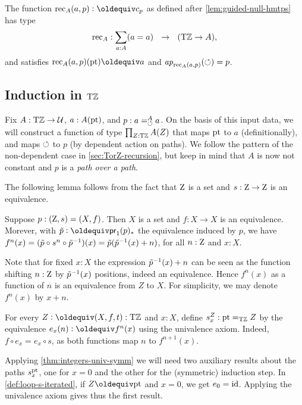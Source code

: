 \documentclass[a4paper,12pt]{amsart}
\begin{document}
\begin{definition}\label{def:TorZrecursor}
  The function ${\rec}_A(a,p) \defeq c_p$ as defined after 
  \cref{lem:guided-null-hmtps} has type
  \[
    {\mathop{\mathrm{rec}}}_A : \sum_{a:A}(a=a) ~~\to~~ ({\mathrm{T}\mathbb{Z}} \to A),
  \]
  and satisfies ${\rec}_A(a,p)(\pt) \jdeq a$ and 
  $\mathop{{\it ap}_{{\mathop{\mathrm{rec}}}_A(a,p)}}(\circlearrowleft) = p$.
\end{definition}

\subsection{Induction in ${\mathrm{T}\mathbb{Z}}$}\label{sec:TorZ-induction}

Fix $A:{\mathrm{T}\mathbb{Z}}\to\mathcal{U}$, $a:A({\mathord{\mathrm{pt}}})$, and $p: a=^A_{\circlearrowleft} a$.
On the basis of this input data, we will construct a function of 
type $\prod_{Z:{\mathrm{T}\mathbb{Z}}} A(Z)$ that maps ${\mathord{\mathrm{pt}}}$ to $a$ (definitionally),
and maps $\circlearrowleft$ to $p$ (by dependent action on paths).
We follow the pattern of the non-dependent case
in \cref{sec:TorZ-recursion}, but keep in mind that 
$A$ is now not constant and $p$ is a \emph{path over a path}.

The following lemma follows from the fact that $\mathrm{Z}$ is a set
and $s: \mathrm{Z}\to\mathrm{Z}$ is an equivalence.

\begin{lemma}\label{lem:paths-in-TorZ}
  Suppose $p : (\mathrm{Z},s)=(X,f)$.  Then $X$ is a set and $f: X\to X$ is an equivalence.
  Morever, with $\ptoe{p}\defeq \mathsf{pr}_1(p)_*$ the equivalence induced by $p$, we have 
  $f^n(x) = (\tilde {p}\circ s^n \circ \tilde {p}^{-1})(x) = \tilde {p}(\tilde {p}^{-1}(x)+n)$, 
  for all $n:\mathrm{Z}$ and $x:X$.
\end{lemma}

Note that for fixed $x:X$ the expression $\tilde {p}^{-1}(x)+n$ can be seen as 
the function shifting $n:\mathrm{Z}$ by $\tilde {p}^{-1}(x)$ positions, indeed an equivalence.
Hence $f^n(x)$ as a function of $n$ is an equivalence from $Z$ to $X$.
For simplicity, we may denote $f^n(x)$ by $x+n$.

\begin{definition}\label{def:loop-s-iterated}
  For every $Z\defeq(X,f,t):\TorZ$ and $x:X$, 
  define $s^Z_x: {\mathord{\mathrm{pt}}} =_{\mathrm{T}\mathbb{Z}} Z$ by the equivalence
  $e_x(n)\defeq f^n(x)$ using the univalence axiom. Indeed, 
  $f\circ e_x = e_x \circ s$, as both functions map $n$ to $f^{n+1}(x)$. 
\end{definition}

Applying \cref{thm:integers-univ-symm} we will need two auxiliary 
results about the paths $s^{\mathord{\mathrm{pt}}}_x$, one for $x=0$ and 
the other for the (symmetric) induction step.
In \cref{def:loop-s-iterated}, if $Z\jdeq\pt$ and $x=0$, we get $e_0 = \mathord{\mathrm{id}}$.
Applying the univalence axiom gives thus the first result.
\end{document}
